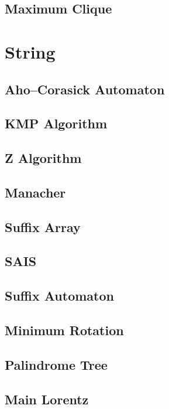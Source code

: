 \subsection{Maximum Clique}

\section{String}
\subsection{Aho–Corasick Automaton}

\subsection{KMP Algorithm}

\subsection{Z Algorithm}
\subsection{Manacher}
\subsection{Suffix Array}
\subsection{SAIS}
\subsection{Suffix Automaton}

\subsection{Minimum Rotation}
\subsection{Palindrome Tree}

\subsection{Main Lorentz}

